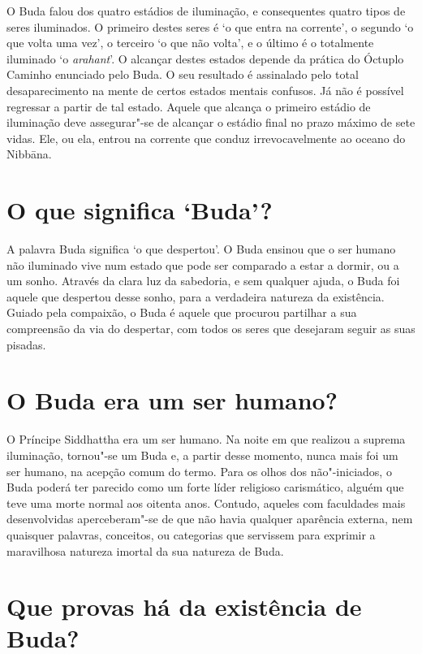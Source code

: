 O Buda falou dos quatro estádios de iluminação, e consequentes quatro
tipos de seres iluminados. O primeiro destes seres é `o que entra na
corrente', o segundo `o que volta uma vez', o terceiro `o que não
volta', e o último é o totalmente iluminado `o \emph{arahant}'. O
alcançar destes estados depende da prática do Óctuplo Caminho enunciado
pelo Buda. O seu resultado é assinalado pelo total desaparecimento na
mente de certos estados mentais confusos. Já não é possível regressar a
partir de tal estado. Aquele que alcança o primeiro estádio de
iluminação deve assegurar"-se de alcançar o estádio final no prazo máximo
de sete vidas. Ele, ou ela, entrou na corrente que conduz
irrevocavelmente ao oceano do Nibbāna.

\section{O que significa `Buda'?}

A palavra Buda significa `o que despertou'. O Buda ensinou que o ser
humano não iluminado vive num estado que pode ser comparado a estar a
dormir, ou a um sonho. Através da clara luz da sabedoria, e sem qualquer
ajuda, o Buda foi aquele que despertou desse sonho, para a verdadeira
natureza da existência. Guiado pela compaixão, o Buda é aquele que
procurou partilhar a sua compreensão da via do despertar, com todos os
seres que desejaram seguir as suas pisadas.

\section{O Buda era um ser humano?}

O Príncipe Siddhattha era um ser humano. Na noite em que realizou a
suprema iluminação, tornou"-se um Buda e, a partir desse momento, nunca
mais foi um ser humano, na acepção comum do termo. Para os olhos dos
não"-iniciados, o Buda poderá ter parecido como um forte líder religioso
carismático, alguém que teve uma morte normal aos oitenta anos. Contudo,
aqueles com faculdades mais desenvolvidas aperceberam"-se de que não
havia qualquer aparência externa, nem quaisquer palavras, conceitos, ou
categorias que servissem para \mbox{exprimir} a maravilhosa natureza imortal da
sua natureza de Buda.

\section{Que provas há da existência de Buda?}

